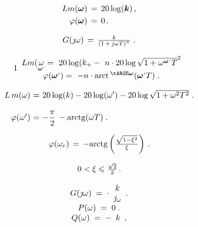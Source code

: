 \documentclass{article}
\begin{document}
\[
$$
\begin{aligned} {L m ( \boldsymbol{\omega} )} & {{} \,=\, 2 0 \operatorname{l o g} ( \boldsymbol{k} ) \,,} \\ {\varphi( \boldsymbol{\omega} )} & {{} \,=\, 0 \,.} \\ \end{aligned}
$$
\]

\[
$$
G ( \jmath\omega) \,=\, \frac{k} {\left( 1 \,+\, j \omega T \right)^{n}} \;.
$$
\]

\[
1
$$
\begin{array} {c} {L m ( \underset{\boldsymbol{\omega}^{\boldsymbol{\cdot}}} {\scriptsize{\omega}}=\ 2 0 \operatorname{l o g} ( k_{+}-\ n \cdot2 0 \operatorname{l o g} \sqrt{1+\omega^{\boldsymbol{\omega}^{\boldsymbol{\cdot}}} T}^{2}} \\ {\varphi( \boldsymbol{\omega}^{\boldsymbol{\cdot}} )=\ -n \cdot\operatorname{a r c t} {}^{\boldsymbol{\tARGE\mathbf{\omega}}} ( \boldsymbol{\omega}^{\boldsymbol{\cdot}} T ) \;.} \\ \end{array}
$$
\]

\[
$$
\begin{array} {r c l} {{L \, m ( \omega) \! \!}} & {{\! \!=\! \!}} & {{\! \! 2 0 \log( k )-2 0 \log( \omega^{\prime} )-2 0 \log\sqrt{1+\omega^{2} T^{2}} \;.}} \\ {{}} & {{}} & {{}} \\ {{\varphi( \omega^{\prime} ) \! \!}} & {{\! \!=\! \!}} & {{\! \!-\displaystyle\frac{\pi} {2} \,-\operatorname{a r c t g} ( \omega T ) \;.}} \end{array}
$$
\]

\[
$$
\varphi( \omega_{r} ) \,=\,-\mathrm{a r c t g} \left( \frac{\sqrt{1-\xi^{2}}} {\xi} \right) \,.
$$
\]

\[
$$
0 < \xi\leqslant\frac{\sqrt{2}} {2} \,.
$$
\]

\[
$$
\begin{array} {c} {G ( \jmath\omega) \;=\; \cdot\begin{array} {c} {k} \\ {j_{\omega}} \\ \end{array}.} \\ {P ( \omega) \;=\; 0 \;.} \\ {Q ( \omega) \;=\;-\begin{array} {c} {k} \\ \end{array},} \\ \end{array}
$$
\]
\end{document}
